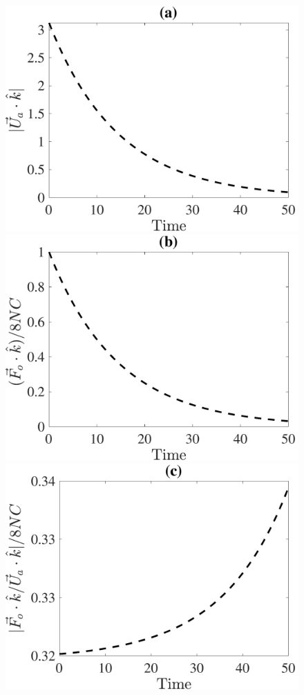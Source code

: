 \begin{figure}[h]
	\begin{center}
		\includegraphics[scale=0.35]{./figures/fig_NC50_bs_Ua3_all.pdf}
		\includegraphics[scale=0.35]{./figures/fig_NC50_bs_Fo3_all}
		\includegraphics[scale=0.35]{./figures/fig_NC50_bs_Fo3Ua_ratio}

\end{center}
\end{figure}
